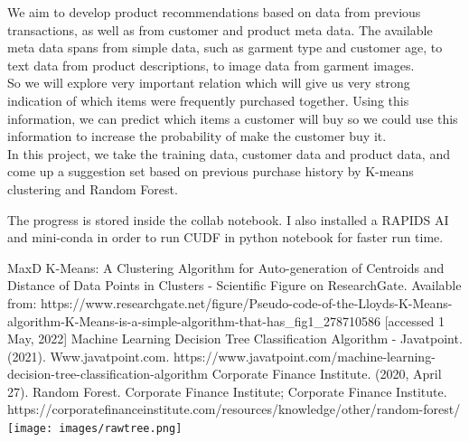 \documentclass{article}
\begin{document}
We aim to develop product recommendations based on data from previous transactions, as well as from customer and product meta data. The available meta data spans from simple data, such as garment type and customer age, to text data from product descriptions, to image data from garment images.\\

So we will explore very important relation which will give us very strong indication of which items were frequently purchased together. Using this information, we can predict which items a customer will buy so we could use this information to increase the probability of make the customer buy it.\\

In this project, we take the training data, customer data and product data, and come up a suggestion set based on previous purchase history by K-means clustering and Random Forest.

The progress is stored inside the collab notebook. I also installed a RAPIDS AI and mini-conda in order to run CUDF in python notebook for faster run time.
\begin{thebibliography}{2}
MaxD K-Means: A Clustering Algorithm for Auto-generation of Centroids and Distance of Data Points in Clusters - Scientific Figure on ResearchGate. Available from: https://www.researchgate.net/figure/Pseudo-code-of-the-Lloyds-K-Means-algorithm-K-Means-is-a-simple-algorithm-that-has\_fig1\_278710586 [accessed 1 May, 2022]
Machine Learning Decision Tree Classification Algorithm - Javatpoint. (2021). Www.javatpoint.com. https://www.javatpoint.com/machine-learning-decision-tree-classification-algorithm
Corporate Finance Institute. (2020, April 27). Random Forest. Corporate Finance Institute; Corporate Finance Institute. https://corporatefinanceinstitute.com/resources/knowledge/other/random-forest/
\texttt{[image: images/rawtree.png]}
\end{thebibliography}
\end{document}
